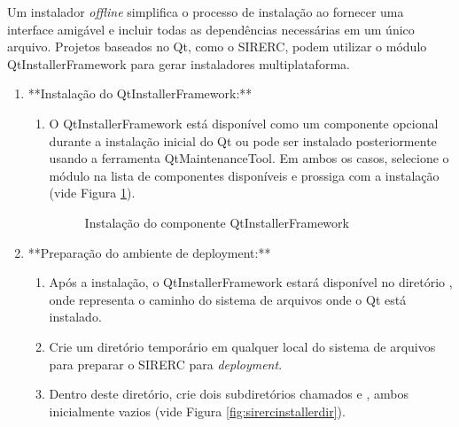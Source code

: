 \documentclass[a4paper,11pt]{article}
\newcommand{\sistema}{\textsf{SIRERC}}
\begin{document}
Um instalador \emph{offline} simplifica o processo de instalação ao fornecer uma interface amigável e incluir todas as dependências necessárias em um único arquivo. Projetos baseados no Qt, como o \sistema{}, podem utilizar o módulo QtInstallerFramework para gerar instaladores multiplataforma.

\begin{enumerate}
	\item **Instalação do QtInstallerFramework:**
	\begin{enumerate}
		\item O QtInstallerFramework está disponível como um componente opcional durante a instalação inicial do Qt ou pode ser instalado posteriormente usando a ferramenta QtMaintenanceTool. Em ambos os casos, selecione o módulo na lista de componentes disponíveis e prossiga com a instalação (vide Figura \ref{fig:qtinstallerframework}).
		
		\begin{figure}[H]\centering
			\caption{Instalação do componente QtInstallerFramework}\label{fig:qtinstallerframework}
		\end{figure}
	\end{enumerate}
	
	\item **Preparação do ambiente de deployment:**
	\begin{enumerate}
		\item Após a instalação, o QtInstallerFramework estará disponível no diretório , onde  representa o caminho do sistema de arquivos onde o Qt está instalado.
		\item Crie um diretório temporário em qualquer local do sistema de arquivos para preparar o \sistema{} para \emph{deployment}.
		\item Dentro deste diretório, crie dois subdiretórios chamados  e , ambos inicialmente vazios (vide Figura \ref{fig:sirercinstallerdir}).
		

\end{enumerate}
\end{enumerate}
\end{document}
